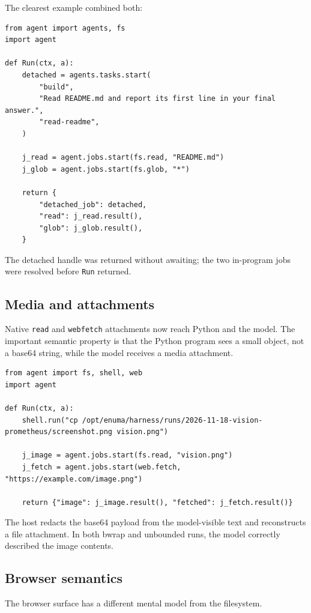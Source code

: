 \documentclass[11pt]{article}
\newcommand{\code}[1]{\texttt{#1}}
\begin{document}
The clearest example combined both:

\begin{lstlisting}[style=python]
from agent import agents, fs
import agent

def Run(ctx, a):
    detached = agents.tasks.start(
        "build",
        "Read README.md and report its first line in your final answer.",
        "read-readme",
    )

    j_read = agent.jobs.start(fs.read, "README.md")
    j_glob = agent.jobs.start(fs.glob, "*")

    return {
        "detached_job": detached,
        "read": j_read.result(),
        "glob": j_glob.result(),
    }
\end{lstlisting}

The detached handle was returned without awaiting; the two in-program jobs were
resolved before \code{Run} returned.

\subsection{Media and attachments}

Native \code{read} and \code{webfetch} attachments now reach Python and the
model.  The important semantic property is that the Python program sees a small
object, not a base64 string, while the model receives a media attachment.

\begin{lstlisting}[style=python]
from agent import fs, shell, web
import agent

def Run(ctx, a):
    shell.run("cp /opt/enuma/harness/runs/2026-11-18-vision-prometheus/screenshot.png vision.png")

    j_image = agent.jobs.start(fs.read, "vision.png")
    j_fetch = agent.jobs.start(web.fetch, "https://example.com/image.png")

    return {"image": j_image.result(), "fetched": j_fetch.result()}
\end{lstlisting}

The host redacts the base64 payload from the model-visible text and reconstructs
a file attachment.  In both bwrap and unbounded runs, the model correctly
described the image contents.

\subsection{Browser semantics}

The browser surface has a different mental model from the filesystem.
\end{document}
